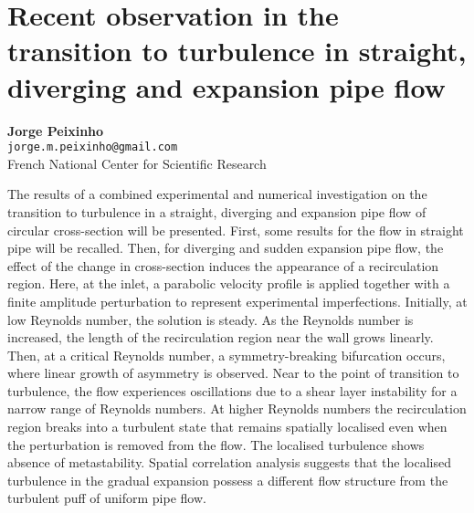 
\section{Recent observation in the transition to turbulence in straight, diverging and expansion pipe flow}

\textbf{Jorge Peixinho}\\
\texttt{\small{jorge.m.peixinho@gmail.com}}\\
French National Center for Scientific Research

The results of a combined experimental and numerical investigation on the transition to turbulence in a straight, diverging and expansion pipe flow of circular cross-section will be presented. First, some results for the flow in straight pipe will be recalled. Then, for diverging and sudden expansion pipe flow, the effect of the change in cross-section induces the appearance of a recirculation region. Here, at the inlet, a parabolic velocity profile is applied together with a finite amplitude perturbation to represent experimental imperfections. Initially, at low Reynolds number, the solution is steady. As the Reynolds number is increased, the length of the recirculation region near the wall grows linearly. Then, at a critical Reynolds number, a symmetry-breaking bifurcation occurs, where linear growth of asymmetry is observed. Near to the point of transition to turbulence, the flow experiences oscillations due to a shear layer instability for a narrow range of Reynolds numbers. At higher Reynolds numbers the recirculation region breaks into a turbulent state that remains spatially localised even when the perturbation is removed from the flow. The localised turbulence shows absence of metastability. Spatial correlation analysis suggests that the localised turbulence in the gradual expansion possess a different flow structure from the turbulent puff of uniform pipe flow.

